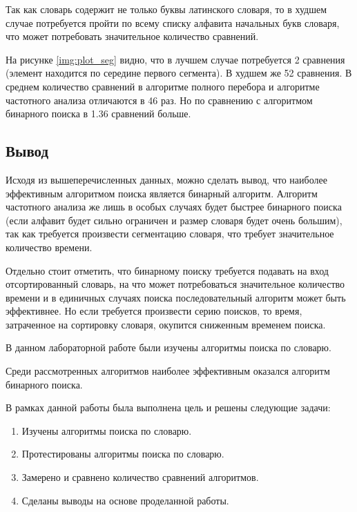 Так как словарь содержит не только буквы латинского словаря, то в худшем случае потребуется пройти по всему списку алфавита начальных букв словаря, что может потребовать значительное количество сравнений.

На рисунке \ref{img:plot_seg} видно, что в лучшем случае потребуется 2 сравнения (элемент находится по середине первого сегмента). В худшем же 52 сравнения. В среднем количество сравнений в алгоритме полного перебора и алгоритме частотного анализа отличаются в 46 раз. Но по сравнению с алгоритмом бинарного поиска в 1.36 сравнений больше.

\subsection{Вывод}

Исходя из вышеперечисленных данных, можно сделать вывод, что наиболее эффективным алгоритмом поиска является бинарный алгоритм. Алгоритм частотного анализа же лишь в особых случаях будет быстрее бинарного поиска (если алфавит будет сильно ограничен и размер словаря будет очень большим), так как требуется произвести сегментацию словаря, что требует значительное количество времени.

Отдельно стоит отметить, что бинарному поиску требуется подавать на вход отсортированный словарь, на что может потребоваться значительное количество времени и в единичных случаях поиска последовательный алгоритм может быть эффективнее. Но если требуется произвести серию поисков, то время, затраченное на сортировку словаря, окупится сниженным временем поиска.


В данном лабораторной работе были изучены алгоритмы поиска по словарю.

Среди рассмотренных алгоритмов наиболее эффективным оказался алгоритм бинарного поиска.

В рамках данной работы была выполнена цель и решены следующие задачи:

\begin{enumerate}
    \item Изучены алгоритмы поиска по словарю.
    \item Протестированы алгоритмы поиска по словарю.
    \item Замерено и сравнено количество сравнений алгоритмов.
    \item Сделаны выводы на основе проделанной работы.
\end{enumerate}

